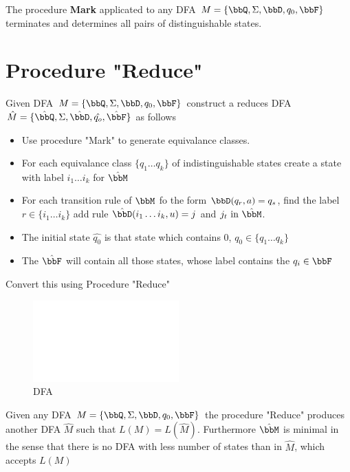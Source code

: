 
\begin{theorem}{}
    The procedure \textbf{Mark} applicated to any DFA $M = \{\bbQ, \Sigma, \bbD, q_0, \bbF\}$ terminates and determines all pairs of distinguishable states.
\end{theorem}

\section{Procedure "Reduce"}

Given DFA $M = \{\bbQ, \Sigma, \bbD, q_0, \bbF\}$ construct a reduces DFA $\hat{M} = \{ \hat{\bbQ}, \Sigma, \hat{\bbD}, \hat{q_o}, \hat{\bbF} \}$ as follows 

\begin{itemize}
    \item Use procedure "Mark" to generate equivalance classes. 
    \item For each equivalance class $\{ q_1 \ldots q_k \} $ of indistinguishable states create a state with label $i_1 \ldots i_k$ for $\hat{\bbM}$
    \item For each transition rule of $\bbM$ fo the form $\bbD(q_r, a) = q_s$, find the label $r \in \{i_1 \ldots i_k\}$ add rule $\hat{\bbD}(i_1 \ldots i_k, u) = j $ and $j_t \text{ in } \hat{\bbM}$. 
    \item The initial state $\hat{q_0}$ is that state which contains 0, $q_0 \in \{q_1 \ldots q_k\}$
    \item The $\hat{\bbF}$ will contain all those states, whose label contains the $q_i \in \bbF$ 
\end{itemize}

\begin{example}
    Convert this using Procedure "Reduce"
\end{example}

\begin{figure}[!h]
    \centering
    \includegraphics[width=0.5\textwidth]{figures/default.png}
    \caption{DFA}
\end{figure}

\begin{theorem}{}
    Given any DFA $M = \{\bbQ, \Sigma, \bbD, q_0, \bbF\}$ the procedure "Reduce" produces another DFA $\hat{M}$ such that $L(M) = L(\hat{M})$.  Furthermore $\hat{\bbM}$ is minimal in the sense that there is no DFA with less number of states than in $\hat{M}$, which accepts $L(M)$
\end{theorem}

